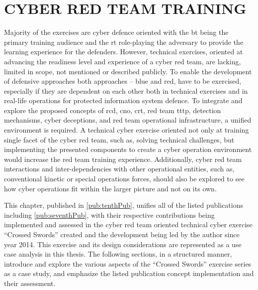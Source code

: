 \section{CYBER RED TEAM TRAINING}
\label{sec:exercises}
\glsresetall
Majority of the exercises are cyber defence oriented with the \gls{bt} being the primary training audience and the \gls{rt} role-playing the adversary to provide the learning experience for the defenders. However, technical exercises, oriented at advancing the readiness level and experience of a cyber red team, are lacking, limited in scope, not mentioned or described publicly. 
To enable the development of defensive approaches both approaches -- blue and red, have to be exercised, especially if they are dependent on each other both in technical exercises and in real-life operations for protected information system defence.
To integrate and explore the proposed concepts of \gls{rcd}, \gls{cno}, \gls{crt}, red team \gls{tttp}, detection mechanisms, cyber deceptions, and red team operational infrastructure, a unified environment is required. A technical cyber exercise oriented not only at training single facet of the cyber red team, such as, solving technical challenges, but implementing the presented components to create a cyber operation environment would increase the red team training experience. Additionally, cyber red team interactions and inter-dependencies with other operational entities, such as, conventional kinetic or special operations forces, should also be explored to see how cyber operations fit within the larger picture and not on its own.

This chapter, published in \ref{pub:tenthPub}, unifies all of the listed publications including \ref{pub:seventhPub}, with their respective contributions being implemented and assessed in the cyber red team oriented technical cyber exercise ``Crossed Swords'' created and the development being led by the author since year 2014. This exercise and its design considerations are represented as a use case analysis in this thesis.
The following sections, in a structured manner, introduce and explore the various aspects of the ``Crossed Swords'' exercise series as a case study, and emphasize the listed publication concept implementation and their assessment.

